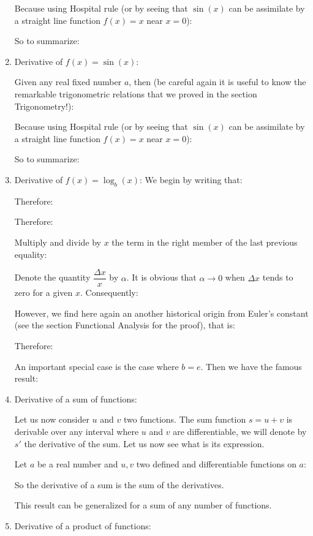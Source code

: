 \begin{enumerate}
		 Because using Hospital rule (or by seeing that $\sin(x)$ can be assimilate by a straight line function $f(x)=x$ near $x=0$):
		 
		 So to summarize:
		 
		 
		 \item Derivative of $f(x)=\sin(x)$:
		 
		 Given any real fixed number $a$, then (be careful again it is useful to know the remarkable trigonometric relations that we proved in the section Trigonometry!):
		 
		 Because using Hospital rule (or by seeing that $\sin(x)$ can be assimilate by a straight line function $f(x)=x$ near $x=0$):
		 
		 So to summarize:
		 
		 \item Derivative of $f(x)=\log_b(x)$:
		 We begin by writing that:
		 
		 Therefore:
		 
		 Therefore:
		 
		 Multiply and divide by $x$ the term in the right member of the last previous equality:
		 
		 Denote the quantity $\dfrac{\Delta x}{x}$ by $\alpha$. It is obvious that $\alpha \rightarrow 0$ when $\Delta x$ tends to zero for a given $x$. Consequently:
		 
		 However, we find here again an another historical origin from Euler's constant (see the section Functional Analysis for the proof), that is:
		 
		 Therefore:
		 
		 An important special case is the case where $b = e$. Then we have the famous result:
		  
		 \item Derivative of a sum of functions:
		 
		 Let us now consider $u$ and $v$ two functions. The sum function $s=u+v$ is derivable over any interval where $u$ and $v$ are differentiable, we will denote by $s'$ the derivative of the sum. Let us now see what is its expression.
		 
		 Let $a$ be a real number and $u,v$ two defined and differentiable functions on $a$:
		 
		 
		 So the derivative of a sum is the sum of the derivatives.
		 
		 This result can be generalized for a sum of any number of functions.
		 
		 \item Derivative of a product of functions:
		 

\end{enumerate}
